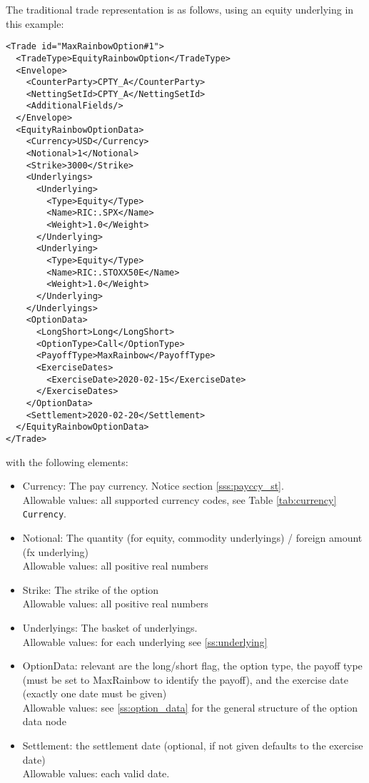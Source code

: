 The traditional trade representation is as follows, using an equity underlying in this example:

\begin{verbatim}
<Trade id="MaxRainbowOption#1">
  <TradeType>EquityRainbowOption</TradeType>
  <Envelope>
    <CounterParty>CPTY_A</CounterParty>
    <NettingSetId>CPTY_A</NettingSetId>
    <AdditionalFields/>
  </Envelope>
  <EquityRainbowOptionData>
    <Currency>USD</Currency>
    <Notional>1</Notional>
    <Strike>3000</Strike>
    <Underlyings>
      <Underlying>
        <Type>Equity</Type>
        <Name>RIC:.SPX</Name>
        <Weight>1.0</Weight>
      </Underlying>
      <Underlying>
        <Type>Equity</Type>
        <Name>RIC:.STOXX50E</Name>
        <Weight>1.0</Weight>
      </Underlying>
    </Underlyings>
    <OptionData>
      <LongShort>Long</LongShort>
      <OptionType>Call</OptionType>
      <PayoffType>MaxRainbow</PayoffType>
      <ExerciseDates>
        <ExerciseDate>2020-02-15</ExerciseDate>
      </ExerciseDates>
    </OptionData>
    <Settlement>2020-02-20</Settlement>
  </EquityRainbowOptionData>
</Trade>
\end{verbatim}

with the following elements:

\begin{itemize}
\item Currency: The pay currency. Notice section \ref{sss:payccy_st}. \\
  Allowable values: all supported currency codes, see Table \ref{tab:currency} \lstinline!Currency!.
\item Notional: The quantity (for equity, commodity underlyings) / foreign amount (fx underlying) \\
  Allowable values: all positive real numbers
\item Strike: The strike of the option \\
  Allowable values: all positive real numbers
\item Underlyings: The basket of underlyings. \\
  Allowable values: for each underlying see \ref{ss:underlying}
\item OptionData: relevant are the long/short flag, the option type, the payoff type (must be set to MaxRainbow to
  identify the payoff), and the exercise date (exactly one date must be given) \\
  Allowable values: see \ref{ss:option_data} for the general structure of the option data node
\item Settlement: the settlement date (optional, if not given defaults to the exercise date) \\
  Allowable values: each valid date.
\end{itemize}

